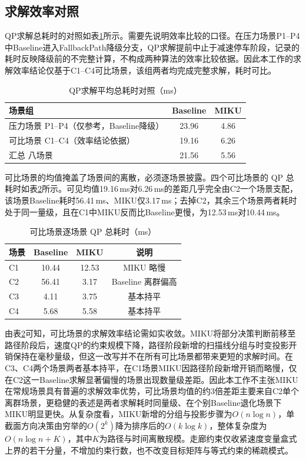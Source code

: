 \documentclass[a4paper,11pt]{ctexart}
\theoremstyle{definition}
\begin{document}
\subsection{求解效率对照}
\label{subsec:exp_qp}

QP求解总耗时的对照如表\ref{tab:exp_qp}所示。需要先说明效率比较的口径。在压力场景P1--P4中Baseline进入FallbackPath降级分支，QP求解提前中止于减速停车阶段，记录的耗时反映降级前的不完整计算，不构成两种算法的效率比较依据。因此本工作的求解效率结论仅基于C1--C4可比场景，该组两者均完成完整求解，耗时可比。

\begin{table}[htbp]
\centering
\caption{QP求解平均总耗时对照（ms）}
\label{tab:exp_qp}
\small
\begin{tabular}{lcc}
\toprule
\textbf{场景组} & \textbf{Baseline} & \textbf{MIKU} \\
\midrule
压力场景 P1--P4（仅参考，Baseline降级） & 23.96 & 4.86 \\
可比场景 C1--C4（效率结论依据） & 19.16 & 6.26 \\
\midrule
汇总 八场景 & 21.56 & 5.56 \\
\bottomrule
\end{tabular}
\end{table}

可比场景的均值掩盖了场景间的离散，必须逐场景披露。四个可比场景的 QP 总耗时如表\ref{tab:exp_qp_percomp}所示。可见均值19.16\,ms对6.26\,ms的差距几乎完全由C2一个场景支配，该场景Baseline耗时56.41\,ms、MIKU仅3.17\,ms；去掉C2，其余三个场景两者耗时处于同一量级，且在C1中MIKU反而比Baseline更慢，为12.53\,ms对10.44\,ms。

\begin{table}[htbp]
\centering
\caption{可比场景逐场景 QP 总耗时（ms）}
\label{tab:exp_qp_percomp}
\small
\begin{tabular}{lccc}
\toprule
\textbf{场景} & \textbf{Baseline} & \textbf{MIKU} & \textbf{说明} \\
\midrule
C1 & 10.44 & 12.53 & MIKU 略慢 \\
C2 & 56.41 & 3.17 & Baseline 离群偏高 \\
C3 & 4.11 & 3.75 & 基本持平 \\
C4 & 5.68 & 5.58 & 基本持平 \\
\bottomrule
\end{tabular}
\end{table}

由表\ref{tab:exp_qp_percomp}可知，可比场景的求解效率结论需如实收敛。MIKU将部分决策判断前移至路径阶段后，速度QP的约束规模下降，路径阶段新增的扫描线分组与时变投影开销保持在毫秒量级，但这一改写并不在所有可比场景都带来更短的求解时间。在C3、C4两个场景两者基本持平，在C1场景MIKU因路径阶段新增开销而略慢，仅在C2这一Baseline求解显著偏慢的场景出现数量级差距。因此本工作不主张MIKU在常规场景具有普遍的求解效率优势，可比场景均值的约3倍差距主要来自C2单个离群场景，更稳健的表述是两者求解耗时同量级、在个别Baseline退化场景下MIKU明显更快。从复杂度看，MIKU新增的分组与投影步骤为$O(n \log n)$，单截面方向决策由穷举的$O(2^k)$降为排序后的$O(k \log k)$，整体复杂度为$O(n \log n + K)$，其中$K$为路径与时间离散规模。走廊约束仅收紧速度变量盒式上界的若干分量，不增加约束行数，也不改变目标矩阵与等式约束的稀疏模式。
\end{document}
